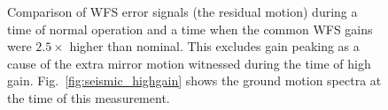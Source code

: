 \begin{figure}
\begin{centering}
\caption[]{Comparison of WFS error signals (the residual motion)
  during a time of normal operation and a time when the common WFS
  gains were $2.5\times$ higher than nominal. This excludes gain
  peaking as a cause of the extra mirror motion witnessed during the
  time of high gain. Fig.~\ref{fig:seismic_highgain} shows the ground
  motion spectra at the time of this measurement.}
\label{fig:WFS_inputbeam}
\end{centering}
\end{figure}


